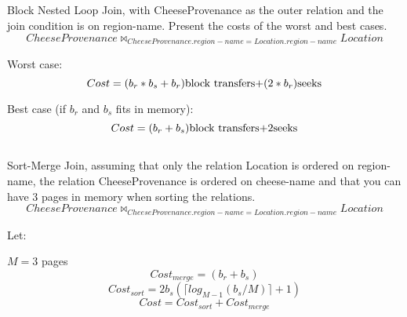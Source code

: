 	\iffalse
		Database System Concepts, Pag 542
	\fi

	\subsection{}
	{\color{gray} Block Nested Loop Join, with CheeseProvenance as the outer relation and the join condition is on region-name. Present the costs of the worst and best cases.}
	\begin{equation}CheeseProvenance \bowtie_{CheeseProvenance.region-name=Location.region-name} Location\end{equation}

	Worst case:
	\begin{equation}Cost = (b_r * b_s + b_r) $block transfers$ + (2 * b_r) $seeks$\end{equation}

	Best case (if $b_r$ and $b_s$ fits in memory):
	\begin{equation}Cost = (b_r + b_s) $block transfers$+ 2 $seeks$\end{equation}
	
	\iffalse
		Database System Concepts, Pag 551
	\fi

	\subsection{}
	{\color{gray}Sort-Merge Join, assuming that only the relation Location is ordered on region-name, the relation CheeseProvenance is ordered on cheese-name and that you can have 3 pages in memory when sorting the relations.}
	\begin{equation}CheeseProvenance \bowtie_{CheeseProvenance.region-name=Location.region-name} Location\end{equation}

	Let:

	\tab $M = 3$ pages
	\begin{equation}Cost_{merge} = (b_r + b_s) \end{equation}
	\begin{equation}Cost_{sort} = 2b_s(\lceil log_{M-1}(b_s/M) \rceil+1) \end{equation}
	\begin{equation}Cost = Cost_{sort} + Cost_{merge} \end{equation}	


